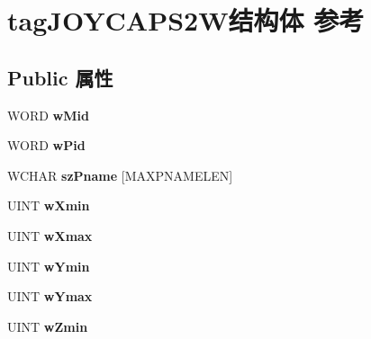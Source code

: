 \hypertarget{structtag_j_o_y_c_a_p_s2_w}{}\section{tag\+J\+O\+Y\+C\+A\+P\+S2\+W结构体 参考}
\label{structtag_j_o_y_c_a_p_s2_w}
\subsection*{Public 属性}
\begin{DoxyCompactItemize}
\item 
\mbox{\label{structtag_j_o_y_c_a_p_s2_w_a4fb8b4e3f1a83e222f4b787d4c56f54d}} 
W\+O\+RD {\bfseries w\+Mid}
\item 
\mbox{\label{structtag_j_o_y_c_a_p_s2_w_a9290b5e3bee2f2404bbf0d39f1035f5e}} 
W\+O\+RD {\bfseries w\+Pid}
\item 
\mbox{\label{structtag_j_o_y_c_a_p_s2_w_a7033d3a748e9f6e097eefc53cfd41dba}} 
W\+C\+H\+AR {\bfseries sz\+Pname} \mbox{[}M\+A\+X\+P\+N\+A\+M\+E\+L\+EN\mbox{]}
\item 
\mbox{\label{structtag_j_o_y_c_a_p_s2_w_ac3b1af0c07382d87c619788db3cf362e}} 
U\+I\+NT {\bfseries w\+Xmin}
\item 
\mbox{\label{structtag_j_o_y_c_a_p_s2_w_a959b22c20da35f209f49b15dc7227cba}} 
U\+I\+NT {\bfseries w\+Xmax}
\item 
\mbox{\label{structtag_j_o_y_c_a_p_s2_w_aec23030223dba1f0c579e2ccb90abf44}} 
U\+I\+NT {\bfseries w\+Ymin}
\item 
\mbox{\label{structtag_j_o_y_c_a_p_s2_w_a8bbd804081b4ab7de9febf2fc8bffef2}} 
U\+I\+NT {\bfseries w\+Ymax}
\item 
\mbox{\label{structtag_j_o_y_c_a_p_s2_w_a9874a59b2eeff25abfe45fc01e9ab3e6}} 
U\+I\+NT {\bfseries w\+Zmin}
\item 
\mbox{\label{structtag_j_o_y_c_a_p_s2_w_a016e0f9783570065145b6102e22feefb}} 

\end{DoxyCompactItemize}

